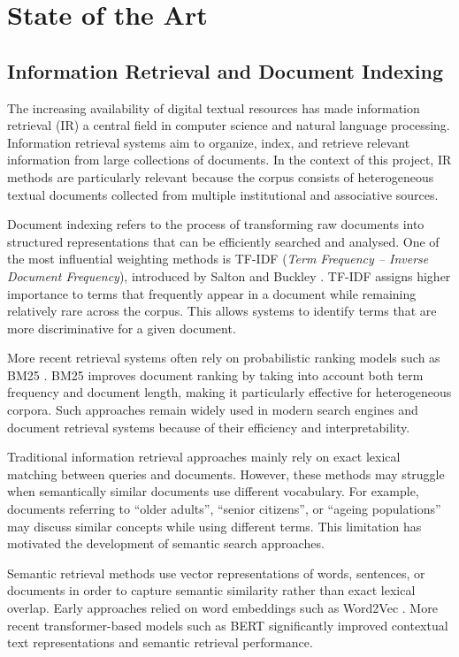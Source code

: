\documentclass[
11pt,
english,
singlespacing,
headsepline,
]{MastersDoctoralThesis}
\begin{document}
\chapter{State of the Art}

\section{Information Retrieval and Document Indexing}

The increasing availability of digital textual resources has made information retrieval (IR) a central field in computer science and natural language processing. Information retrieval systems aim to organize, index, and retrieve relevant information from large collections of documents. In the context of this project, IR methods are particularly relevant because the corpus consists of heterogeneous textual documents collected from multiple institutional and associative sources.

Document indexing refers to the process of transforming raw documents into structured representations that can be efficiently searched and analysed. One of the most influential weighting methods is TF-IDF (\textit{Term Frequency -- Inverse Document Frequency}), introduced by Salton and Buckley \citep{salton1988term}. TF-IDF assigns higher importance to terms that frequently appear in a document while remaining relatively rare across the corpus. This allows systems to identify terms that are more discriminative for a given document.

More recent retrieval systems often rely on probabilistic ranking models such as BM25 \citep{robertson2009probabilistic}. BM25 improves document ranking by taking into account both term frequency and document length, making it particularly effective for heterogeneous corpora. Such approaches remain widely used in modern search engines and document retrieval systems because of their efficiency and interpretability.

Traditional information retrieval approaches mainly rely on exact lexical matching between queries and documents. However, these methods may struggle when semantically similar documents use different vocabulary. For example, documents referring to “older adults”, “senior citizens”, or “ageing populations” may discuss similar concepts while using different terms. This limitation has motivated the development of semantic search approaches.

Semantic retrieval methods use vector representations of words, sentences, or documents in order to capture semantic similarity rather than exact lexical overlap. Early approaches relied on word embeddings such as Word2Vec \citep{mikolov2013efficient}. More recent transformer-based models such as BERT \citep{devlin2019bert} significantly improved contextual text representations and semantic retrieval performance.
\end{document}
